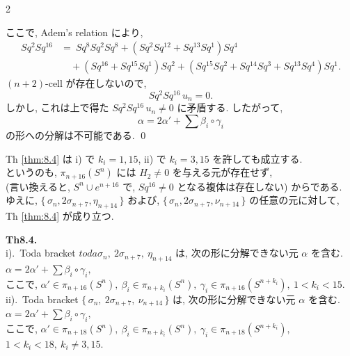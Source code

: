 \documentclass[10pt, leqno]{ltjsarticle}
\newcommand{\toda}[1]{\{\,#1\,\}}              %
\newcommand{\pis}[2]{\pi_{#1}(#2)}       %
\numberwithin{equation}{section}
\theoremstyle{plain}
\theoremstyle{definition}
\theoremstyle{remark}
\begin{document}
\begin{paracol}{2}

\noindent
ここで, Adem's relation により,
\[
\begin{aligned}
Sq^2Sq^{16}
&=\ Sq^8Sq^2Sq^8
  + (Sq^2Sq^{12}+Sq^{13} Sq^1)Sq^4 \\
&\quad + (Sq^{16}+Sq^{15} Sq^1)Sq^2
  + (Sq^{15}Sq^2+Sq^{14}Sq^3+Sq^{13}Sq^4)Sq^1.
\end{aligned}
\]
$(n+2)$-cell が存在しないので,
\[
Sq^2Sq^{16}\,u_n=0.
\]
しかし, これは上で得た
\(
Sq^2Sq^{16}\,u_n\neq0
\)
に矛盾する. したがって,
\[
\alpha=2\alpha'+\sum \beta_i\circ\gamma_i
\]
の形への分解は不可能である.
\qed

Th \ref{thm:8.4} は i) で $k_i=1,15$, ii) で $k_i=3,15$ を許しても成立する. \\
というのも,
\(
\pis{n+16}{S^n}
\)
には $H_2\neq0$ を与える元が存在せず,\\
 (言い換えると,
$S^n\cup e^{n+16}$ で, $Sq^{16}\neq0$ となる複体は存在しない) からである. \\
ゆえに,
\(\toda{\sigma_n,2\sigma_{n+7},\eta_{n+14}}\)
および,
\(\toda{\sigma_n,2\sigma_{n+7},\nu_{n+14}}\)
の任意の元に対して, \\
Th \ref{thm:8.4} が成り立つ. 

\switchcolumn

\noindent
\textbf{Th8.4.}\\
i).\ Toda bracket \(toda{\sigma_n,\ 2\sigma_{n+7},\ \eta_{n+14}}\)
は, 次の形に分解できない元 \(\alpha\) を含む. \\
\(\alpha = 2\alpha' + \sum \beta_i\circ \gamma_i,\) \\
ここで, \(\alpha'\in \pis{n+16}{S^n},\
\beta_i\in \pis{n+k_i}{S^n},\ \gamma_i\in \pis{n+16}{S^{n+k_i}},\ 1<k_i<15.\) \\
ii).\ Toda bracket \(\toda{\sigma_n,\ 2\sigma_{n+7},\ \nu_{n+14}}\)
は, 次の形に分解できない元 \(\alpha\) を含む. \\
\(\alpha = 2\alpha' + \sum \beta_i\circ \gamma_i,\) \\
ここで, \(\alpha'\in \pis{n+18}{S^n},\
\beta_i\in \pis{n+k_i}{S^n},\ \gamma_i\in \pis{n+18}{S^{n+k_i}},\)\\
\(1<k_i<18,\ k_i\ne 3, 15.\)




\end{paracol}

\newpage
\end{document}
